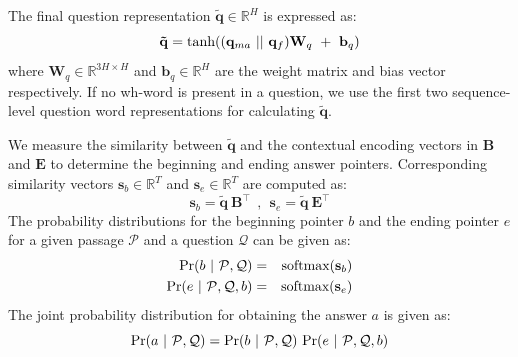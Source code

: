 \documentclass[letterpaper]{article}
\begin{document}
The final question representation $\mathbf{\tilde{q}} \in \mathbb{R} ^{H}$ is expressed as:
\begin{equation}
\label{eq:q_tilde}
\mathbf{\tilde{q}} = \textnormal{tanh} ((\mathbf{q}_{ma} ~||~ \mathbf{q}_{f}) \mathbf{W}_q ~+~ \mathbf{b}_q )
\end{equation}
where $\mathbf{W}_q \in \mathbb{R} ^{3H \times H}$ and $\mathbf{b}_q \in \mathbb{R} ^{H}$ are the weight matrix and bias vector respectively. If no wh-word is present in a question, we use the first two sequence-level question word representations for calculating $\mathbf{\tilde{q}}$.

We measure the similarity between $\mathbf{\tilde{q}}$ and the contextual encoding vectors in $\mathbf{B}$ and $\mathbf{E}$ to determine the beginning and ending answer pointers. Corresponding similarity vectors $\mathbf{s}_b \in \mathbb{R} ^{T}$ and $\mathbf{s}_e \in \mathbb{R} ^{T}$ are computed as:
\begin{equation}
\mathbf{s}_b = \mathbf{\tilde{q}} ~ \mathbf{B}^\top  ~~,~~ \mathbf{s}_e = \mathbf{\tilde{q}} ~ \mathbf{E}^\top
\end{equation}
The probability distributions for the beginning pointer $b$ and the ending pointer $e$ for a given passage $\mathcal{P}$ and a question $\mathcal{Q}$ can be given as:
\begin{eqnarray}
\textnormal{Pr}(b ~|~ \mathcal{P},\mathcal{Q}) &=& \textnormal{softmax}(\mathbf{s}_b) \nonumber \\
\textnormal{Pr}(e ~|~ \mathcal{P},\mathcal{Q}, b) &=& \textnormal{softmax}(\mathbf{s}_e)
\end{eqnarray}
The joint probability distribution for obtaining the answer $a$ is given as:
\begin{equation}
\label{eq:joint_prob}
\textnormal{Pr}(a ~|~ \mathcal{P},\mathcal{Q}) = \textnormal{Pr}(b ~|~ \mathcal{P},\mathcal{Q}) ~ \textnormal{Pr}(e ~|~ \mathcal{P},\mathcal{Q}, b)
\end{equation}
\end{document}
